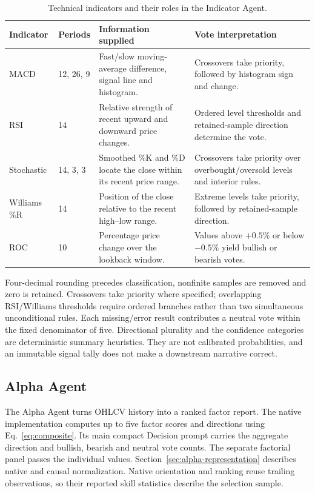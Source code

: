\begin{table}[!htb]
\centering\small
\renewcommand{\arraystretch}{1.18}
\caption{Technical indicators and their roles in the Indicator Agent.}
\label{tab:indicator_overview}
\begin{tabularx}{\textwidth}{p{2.0cm}p{1.6cm}XX}
\hline
Indicator & Periods & Information supplied & Vote interpretation \\
\hline
MACD & 12, 26, 9 & Fast/slow moving-average difference, signal line and histogram. & Crossovers take priority, followed by histogram sign and change. \\
RSI & 14 & Relative strength of recent upward and downward price changes. & Ordered level thresholds and retained-sample direction determine the vote. \\
Stochastic & 14, 3, 3 & Smoothed \%K and \%D locate the close within its recent price range. & Crossovers take priority over overbought/oversold levels and interior rules. \\
Williams \%R & 14 & Position of the close relative to the recent high--low range. & Extreme levels take priority, followed by retained-sample direction. \\
ROC & 10 & Percentage price change over the lookback window. & Values above $+0.5\%$ or below $-0.5\%$ yield bullish or bearish votes. \\
\hline
\end{tabularx}
\end{table}

Four-decimal rounding precedes classification, nonfinite samples are removed and zero is retained. Crossovers take priority where specified; overlapping RSI/Williams thresholds require ordered branches rather than two simultaneous unconditional rules. Each missing/error result contributes a neutral vote within the fixed denominator of five. Directional plurality and the confidence categories are deterministic summary heuristics. They are not calibrated probabilities, and an immutable signal tally does not make a downstream narrative correct.

\subsection{Alpha Agent}
The Alpha Agent turns OHLCV history into a ranked factor report. The
native implementation computes up to five factor scores and directions
using Eq.~\ref{eq:composite}. Its main compact Decision prompt carries
the aggregate direction and bullish, bearish and neutral vote counts.
The separate factorial panel passes the individual values.
Section~\ref{sec:alpha-representation} describes native and causal
normalization. Native orientation and ranking reuse trailing observations,
so their reported skill statistics describe the selection sample.

